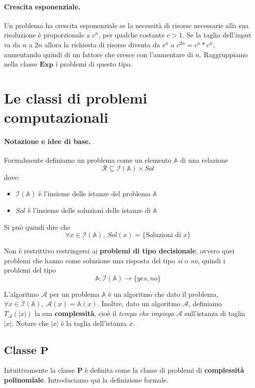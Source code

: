 \documentclass[a4paper]{article}
\theoremstyle{definition}
\newcommand{\Exp}{\mathbf{Exp}}
\newcommand{\p}{\mathbf{P}}
\newcommand{\prob}[1]{\mathbb{#1}}
\newcommand{\instance}[1]{\mathcal{I}(\prob{#1})}
\newcommand{\alg}[1]{\mathcal{#1}}
\newcommand{\compl}[2]{T_\alg{#1}( \vert #2 \vert)}
\begin{document}
			\paragraph{Crescita esponenziale.} Un problema ha crescita esponenziale se la necessità di risorse necessarie alla sua risoluzione è proporzionale a $c^n$, per qualche costante $c > 1$. Se la taglia dell'input va da $n$ a  $2n$ allora la richiesta di risorse diventa da $c^n$ a $c^{2n} = c^n * c^n$, aumentando quindi di un fattore che cresce con l'aumentare di $n$. Raggruppiamo nella classe $\Exp$ i problemi di questo tipo.
			
			\section{Le classi di problemi computazionali}
			\paragraph{Notazione e idee di base.}
			Formalmente definiamo un problema come un elemento $ \prob{A} $ di una relazione 
			\[ 
				\mathcal{R} \subseteq \instance{A} \times Sol 
			\] 
			dove: 
			\begin{itemize}
				\item $\instance{A}$ è l'insieme delle istanze del problema $\prob{A}$
				\item $Sol$ è l'insieme delle soluzioni delle istanze di $\prob{A}$
			\end{itemize}
			Si può quindi dire che 
			\[ 
				\forall x \in \instance{A},\ Sol(x) = \lbrace \text{Soluzioni di } x \rbrace 
			\]
			
			Non è restrittivo restringersi ai \textbf{problemi di tipo decisionale}, ovvero quei problemi che hanno come soluzione una risposta del tipo \textit{si} o \textit{no}, quindi i problemi del tipo \[ \prob{A} : \instance{A} \to \lbrace yes, no \rbrace \]
			
			
			L'algoritmo $\alg{A}$ per un problema $\prob{A}$ è un algoritmo che dato il problema, $\forall x \in \instance{A},\ \alg{A}(x) = \prob{A}(x)$. Inoltre, dato un algoritmo $ \alg{A} $, definiamo $\compl{A}{x}$ la sua \textbf{complessità}, cioè il \textit{tempo che impiega} $\alg{A}$ sull'istanza di taglia $\vert x \vert$. Notare che $\vert x \vert$ è la taglia dell'istanza $x$.
			
			\subsection{Classe $ \p $} 
			Intuitivamente la classe $\p$ è definita come la classe di problemi di \textbf{complessità polinomiale}. Introduciamo qui la definizione formale.
			
\end{document}
